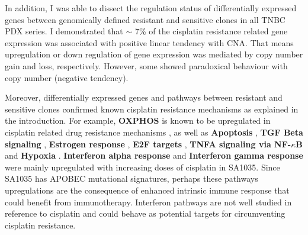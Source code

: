 In addition, I was able to dissect the regulation status of differentially expressed genes between genomically defined resistant and sensitive clones in all TNBC PDX series. 
I demonstrated that $\sim$ 7\% of the cisplatin resistance related gene expression was associated with positive linear tendency with CNA. That means upregulation or down regulation of gene expression was mediated by copy number gain and loss, respectively. However, some 
showed paradoxical behaviour with copy number (negative tendency). 

Moreover, differentially expressed genes and pathways between resistant and sensitive clones confirmed known cisplatin resistance mechanisms as explained in the introduction. For example, \textbf{OXPHOS} is known to be upregulated in cisplatin related drug resistance mechanisms \cite{lee2017myc}, as well as \textbf{Apoptosis} \cite{panaretakis2012cisplatin}, \textbf{TGF Beta signaling} \cite{zhang2019tgfbeta1}, \textbf{Estrogen response} \cite{zhu2018er}, \textbf{E2F targets} \cite{zheng2020upregulation}, \textbf{TNFA signaling via NF-$\kappa$B} \cite{lagunas2008nuclear,ito2015down, ryan2019targeting} and \textbf{Hypoxia} \cite{lee2012hypoxia, mcevoy2015identifying, deben2018hypoxia,li2019erk}.
 \textbf{Interferon alpha response} \cite{provance2019deciphering} and \textbf{Interferon gamma response} \cite{mojic2018dark} were mainly upregulated with increasing doses of cisplatin in SA1035. Since SA1035 has APOBEC mutational signatures, perhaps these pathways upregulations are the consequence of enhanced intrinsic immune response that could benefit from immunotherapy. Interferon pathways are not well studied in reference to cisplatin and could behave as potential targets for circumventing cisplatin resistance.
 
 
